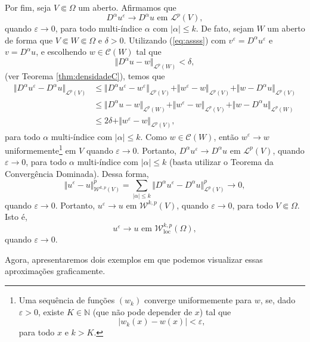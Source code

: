 \documentclass[a4paper, 11pt]{book}
\theoremstyle{definition}
\newcommand{\bN}{\mathbb{N}}
\newcommand{\cC}{\mathcal{C}}
\newcommand{\cL}{\mathcal{L}}
\newcommand{\cW}{\mathcal{W}}
\newcommand{\loc}{\mathrm{loc}}
\begin{document}
\begin{prf}
    Por fim, seja $V \Subset \Omega$ um aberto. Afirmamos que
    \begin{equation}
        D ^\alpha u^\varepsilon \to D^\alpha u \text{ em } \cL^p(V),
    \end{equation}
    quando $\varepsilon \to 0$, para todo multi-índice $\alpha$ com $|\alpha| \leqslant k$.
    De fato, sejam $W$ um aberto de forma que $V \Subset W \Subset \Omega$ e $\delta > 0$. Utilizando (\ref{eq:assss}) com $v ^\varepsilon = D^\alpha u^\varepsilon$ e $v = D^\alpha u$, e escolhendo $w \in \cC(W)$ tal que
    \[
        \Vert D^\alpha u - w \Vert_{\cL^p(W)} < \delta,
    \]
    (ver Teorema \ref{thm:densidadeC}), temos que
    \[
        \begin{aligned}
            \Vert D^\alpha u^\varepsilon - D^\alpha u \Vert_{\cL^p(V)} 
            &\leqslant \Vert D^\alpha u^\varepsilon - w^\varepsilon \Vert_{\cL^p(V)} + \Vert w^\varepsilon - w \Vert_{\cL^p(V)} + \Vert w - D^\alpha u \Vert_{\cL^p(V)}\\
            &\leqslant \Vert D^\alpha u - w \Vert_{\cL^p(W)} + \Vert w^\varepsilon - w \Vert_{\cL^p(V)} + \Vert w - D^\alpha u \Vert_{\cL^p(W)}\\ 
            &\leqslant 2\delta + \Vert w^\varepsilon - w \Vert_{\cL^p(V)},
        \end{aligned}
    \]
    para todo $\alpha$ multi-índice com $|\alpha| \leqslant k$.
    Como $w \in \cC(W)$, então $w^\varepsilon \to w$ uniformemente\footnote{Uma sequência de funções $(w_k)$ converge uniformemente para $w$, se, dado $\varepsilon > 0$, existe $K \in \bN$ (que não pode depender de $x$) tal que
    \[
        | w_k(x) - w(x) | < \varepsilon,
    \]
    para todo $x$ e $k > K$.
    } em $V$ quando $\varepsilon \to 0$. 
    Portanto, $D^\alpha u^\varepsilon \to D^\alpha u$ em $\cL^p(V)$, quando $\varepsilon \to 0$, para todo $\alpha$ multi-índice com $|\alpha| \leqslant k$ (basta utilizar o Teorema da Convergência Dominada).
    Dessa forma,
    \[
        \Vert u^\varepsilon - u \Vert^p_{\cW^{k,p}(V)} = \sum_{|\alpha| \leqslant k} \Vert D^\alpha u^\varepsilon - D^\alpha u \Vert^p_{\cL^p(V)} \to 0,
    \]
    quando $\varepsilon \to 0$. Portanto, $u^\varepsilon \to u$ em $\cW^{k,p}(V)$, quando $\varepsilon \to 0$, para todo $V \Subset \Omega$. Isto é,
    \[
        u^\varepsilon \to u \text{ em } \cW^{k,p}_\loc(\Omega),
    \]
    quando $\varepsilon \to 0$.
\end{prf}

Agora, apresentaremos dois exemplos em que podemos visualizar essas aproximações graficamente.
\end{document}
